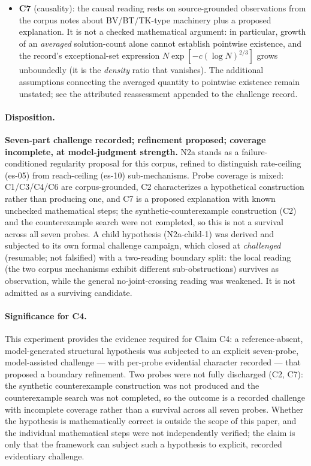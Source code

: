 \documentclass[11pt]{article}
\theoremstyle{gowthm}
\theoremstyle{gowplain}
\begin{document}
\begin{itemize}[nosep]
    read as holding \emph{for this corpus}, not universally.
  \item \textbf{C7} (causality): the causal reading rests on source-grounded
    observations from the corpus notes about BV/BT/TK-type machinery plus a
    proposed explanation. It is not a checked mathematical argument: in
    particular, growth of an \emph{averaged} solution-count alone cannot
    establish pointwise existence, and the record's exceptional-set expression
    $N\exp[-c(\log N)^{2/3}]$ grows unboundedly (it is the \emph{density}
    ratio that vanishes). The additional assumptions connecting the averaged
    quantity to pointwise existence remain unstated; see the attributed
    reassessment appended to the challenge record.
\end{itemize}

\paragraph{Disposition.}
\textbf{Seven-part challenge recorded; refinement proposed; coverage
incomplete, at model-judgment strength.} N2a stands as a failure-conditioned
regularity proposal for this corpus, refined to distinguish rate-ceiling
(es-05) from reach-ceiling (es-10) sub-mechanisms. Probe coverage is mixed:
C1/C3/C4/C6 are corpus-grounded, C2 characterizes a hypothetical
construction rather than producing one, and C7 is a proposed explanation
with known unchecked mathematical steps; the synthetic-counterexample
construction (C2) and the counterexample search were not completed, so this
is not a survival across all seven probes. A child hypothesis (N2a-child-1)
was derived and subjected to its own formal challenge campaign, which closed
at \emph{challenged} (resumable; not falsified) with a two-reading boundary
split: the local reading (the two corpus mechanisms exhibit different
sub-obstructions) survives as observation, while the general no-joint-crossing
reading was weakened. It is not admitted as a surviving candidate.

\paragraph{Significance for C4.}
This experiment provides the evidence required for Claim C4: a reference-absent,
model-generated structural hypothesis was subjected to an explicit seven-probe,
model-assisted challenge --- with per-probe evidential character recorded ---
that proposed a boundary refinement. Two probes were not fully discharged
(C2, C7): the
synthetic counterexample construction was not produced and the counterexample
search was not completed, so the outcome is a recorded challenge with incomplete
coverage rather than a survival across all seven probes. Whether the hypothesis
is mathematically correct is outside the scope of this paper, and the individual
mathematical steps were not independently verified; the claim is only that the
framework can subject such a hypothesis to explicit, recorded evidentiary
challenge.
\end{document}
